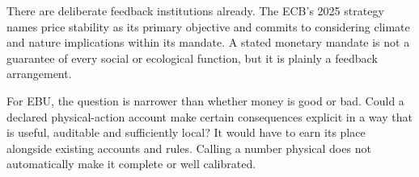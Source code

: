 There are deliberate feedback institutions already. The ECB's 2025 strategy names price stability as its primary objective and commits to considering climate and nature implications within its mandate. A stated monetary mandate is not a guarantee of every social or ecological function, but it is plainly a feedback arrangement.\cite{ecb}

For EBU, the question is narrower than whether money is good or bad. Could a declared physical-action account make certain consequences explicit in a way that is useful, auditable and sufficiently local? It would have to earn its place alongside existing accounts and rules. Calling a number physical does not automatically make it complete or well calibrated.


